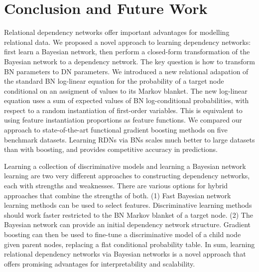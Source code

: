 \documentclass[runningheads,a4paper]{llncs}
\begin{document}
\section{Conclusion and Future Work} 
\label{sec:conclusion}
Relational dependency networks offer important advantages for modelling relational data. We proposed a novel approach to learning dependency networks: first learn a Bayesian network, then perform a closed-form transformation of the Bayesian network to a dependency network. The key question is how to transform BN parameters to DN parameters. We introduced a new relational adapation of the standard BN log-linear equation for the probability of a target node conditional on an assigment of values to its Markov blanket. The new log-linear equation uses a sum of expected values of BN log-conditional probabilities, with respect to a random instantiation of first-order variables. This is equivalent to using feature instantiation proportions as feature functions. We compared our approach to state-of-the-art functional gradient boosting methods  on five benchmark datasets. Learning RDNs via BNs scales much better to large datasets than with boosting, and provides competitive accuracy in predictions.

Learning a collection of discriminative models and learning a Bayesian network learning are two very different approaches to constructing dependency networks, each with strengths and weaknesses. There are various options for hybrid approaches that combine the strengths of both. (1) Fast Bayesian network learning methods can be used to select features. Discriminative learning methods should work  faster restricted to the BN Markov blanket of a target node. (2) The Bayesian network can provide an initial dependency network structure. Gradient boosting can then be used to fine-tune a discriminative model of a child node given parent nodes, replacing a flat conditional probability table. In sum, learning relational dependency networks via Bayesian networks is a novel approach that offers promising advantages for  interpretability and scalability.




\end{document}
